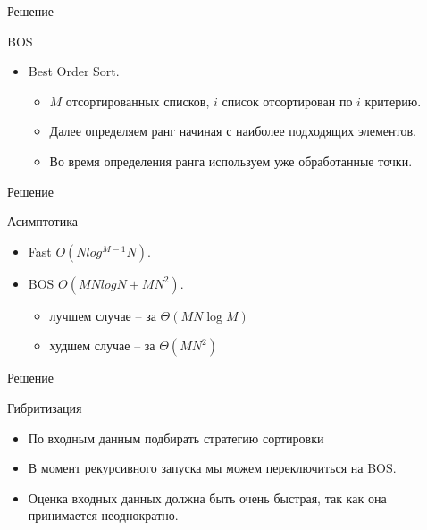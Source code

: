 \documentclass{beamer}
\begin{document}
\begin{frame}{Решение}
\begin{block}{BOS}
\begin{center}
\end{center}
\begin{itemize}
\item Best Order Sort.
\begin{itemize}
\item $M$ отсортированных списков, $i$ список отсортирован по $i$ критерию. 
\item Далее определяем ранг начиная с наиболее подходящих элементов. 
\item Во время определения ранга используем уже обработанные точки.
\end{itemize}
\end{itemize}
\end{block}
\end{frame}


\begin{frame}{Решение}
\begin{block}{Асимптотика}
\begin{itemize}
\item Fast $O(N log^{M-1}N)$.
\item BOS $O(MNlogN + MN^2)$.
\begin{itemize}
\item лучшем случае -- за $\Theta(MN\log{M})$
\item худшем случае -- за $\Theta(MN^2)$
\end{itemize}

\end{itemize}
\end{block}
\end{frame}


\begin{frame}{Решение}
\begin{block}{Гибритизация}
\begin{itemize}
\item По входным данным подбирать стратегию сортировки
\item В момент рекурсивного запуска мы можем переключиться на BOS. 
\item Оценка входных данных должна быть очень быстрая, так как она принимается неоднократно.
\end{itemize}
\end{block}
\end{frame}
\end{document}
